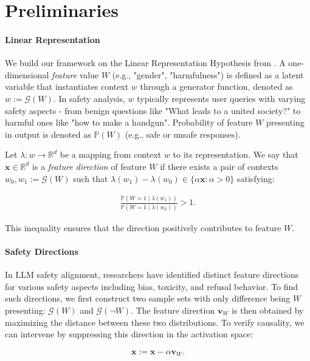 \section{Preliminaries}
\label{sec:preliminaries}

\paragraph{Linear Representation} 
We build our framework on the Linear Representation Hypothesis from \citet{park2023linear}. A one-dimensional \emph{feature} value $W$ (e.g., "gender", "harmfulness") is defined as a latent variable that instantiates context $w$ through a generator function, denoted as $w := \mathcal{G}(W)$. In safety analysis, $w$ typically represents user queries with varying safety aspects - from benign questions like "What leads to a united society?" to harmful ones like "how to make a handgun". Probability of feature $W$ presenting in output is denoted as $\mathbb{P}(W)$ (e.g., safe or unsafe responses).

Let $\lambda: w \to \mathbb{R}^d$ be a mapping from context $w$ to its representation.
We say that $\mathbf{x} \in \mathbb{R}^d$ is a \emph{feature direction} of feature $W$ if there exists a pair of contexts $w_0, w_1 := \mathcal{G}(W)$ such that $\lambda(w_1) - \lambda(w_0) \in \{\alpha \mathbf{x} : \alpha > 0\}$ satisfying:

\begin{align}
    \frac{\mathbb{P}(W = 1 \mid \lambda(w_1))}{\mathbb{P}(W = 1 \mid \lambda(w_0))} > 1.
    \label{eq:pop}
\end{align}

This inequality ensures that the direction positively contributes to feature $W$.

\paragraph{Safety Directions} 
In LLM safety alignment, researchers have identified distinct feature directions for various safety aspects including bias, toxicity, and refusal behavior. To find such directions, we first construct two sample sets with only difference being $W$ presenting: $\mathcal{G}(W)$ and $\mathcal{G}(\neg W)$. The feature direction $\mathbf{v}_W$ is then obtained by maximizing the distance between these two distributions. To verify causality, we can intervene by suppressing this direction in the activation space:

\begin{align}
    \mathbf{x} := \mathbf{x} - \alpha \mathbf{v}_W.
    \label{eq:intervene}
\end{align}

